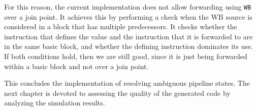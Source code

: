 For this reason, the current implementation does not allow forwarding using \texttt{WB} over a join point. It achieves this by performing a check when the WB source is considered in a block that has multiple predecessors. It checks whether the instruction that defines the value and the instruction that it is forwarded to are in the same basic block, and whether the defining instruction dominates its use. If both conditions hold, then we are still good, since it is just being forwarded within a basic block and not over a join point.

This concludes the implementation of resolving ambiguous pipeline states. The next chapter is devoted to assessing the quality of the generated code by analyzing the simulation results.



 
 
 
 
 
 
